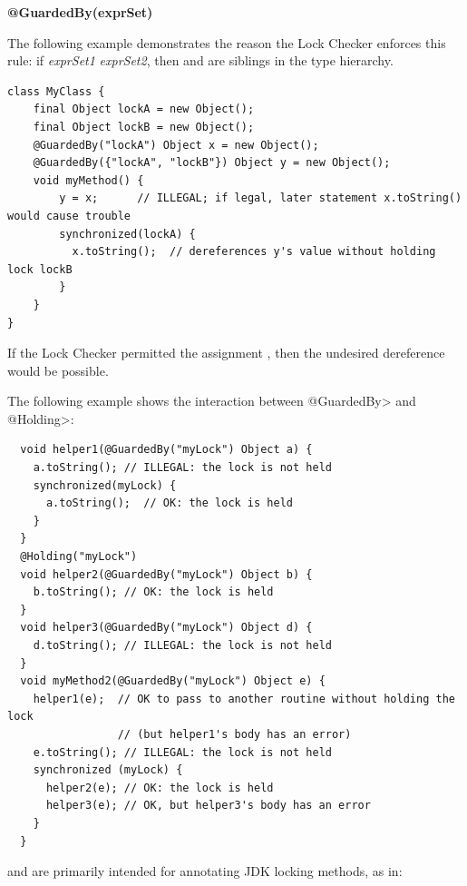 

\textbf{@GuardedBy(exprSet)}

The following example demonstrates the reason the Lock Checker enforces this
rule:  if \emph{exprSet1} \neqsym{} \emph{exprSet2}, then
 and  are siblings in the type
hierarchy.

\begin{Verbatim}
class MyClass {
    final Object lockA = new Object();
    final Object lockB = new Object();
    @GuardedBy("lockA") Object x = new Object();
    @GuardedBy({"lockA", "lockB"}) Object y = new Object();
    void myMethod() {
        y = x;      // ILLEGAL; if legal, later statement x.toString() would cause trouble
        synchronized(lockA) {
          x.toString();  // dereferences y's value without holding lock lockB
        }
    }
}
\end{Verbatim}


If the Lock Checker permitted the assignment
, then the undesired dereference would be possible.



The following example shows the interaction between \<@GuardedBy> and
\<@Holding>:

\begin{Verbatim}
  void helper1(@GuardedBy("myLock") Object a) {
    a.toString(); // ILLEGAL: the lock is not held
    synchronized(myLock) {
      a.toString();  // OK: the lock is held
    }
  }
  @Holding("myLock")
  void helper2(@GuardedBy("myLock") Object b) {
    b.toString(); // OK: the lock is held
  }
  void helper3(@GuardedBy("myLock") Object d) {
    d.toString(); // ILLEGAL: the lock is not held
  }
  void myMethod2(@GuardedBy("myLock") Object e) {
    helper1(e);  // OK to pass to another routine without holding the lock
                 // (but helper1's body has an error)
    e.toString(); // ILLEGAL: the lock is not held
    synchronized (myLock) {
      helper2(e); // OK: the lock is held
      helper3(e); // OK, but helper3's body has an error
    }
  }
\end{Verbatim}



 and  are primarily intended
for annotating JDK locking methods, as in:

